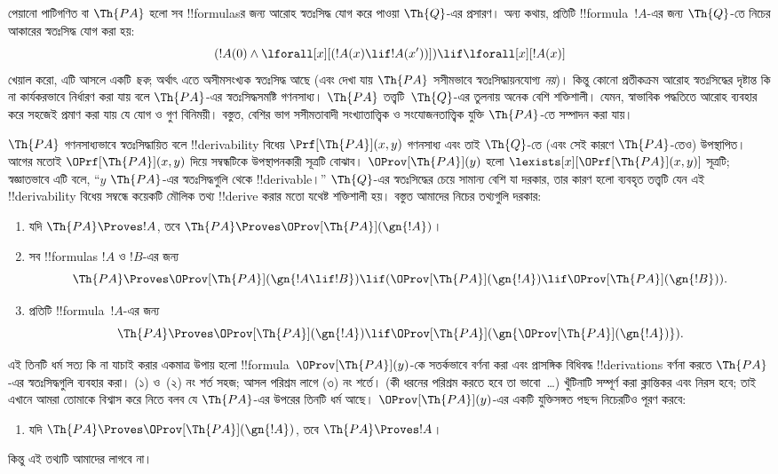 \documentclass[../../../include/open-logic-section]{subfiles}
\begin{document}


পেয়ানো পাটিগণিত বা $\Th{PA}$ হলো সব !!{formula}sর জন্য আরোহ
স্বতঃসিদ্ধ যোগ করে পাওয়া $\Th{Q}$-এর প্রসারণ। অন্য কথায়, প্রতিটি
!!{formula}~$!A$-এর জন্য $\Th{Q}$-তে নিচের আকারের স্বতঃসিদ্ধ যোগ করা হয়:
\[
(!A(0) \land \lforall[x][(!A(x) \lif !A(x'))]) \lif \lforall[x][!A(x)]
\]
খেয়াল করো, এটি আসলে একটি \emph{ছক}; অর্থাৎ এতে অসীমসংখ্যক স্বতঃসিদ্ধ
আছে (এবং দেখা যায় $\Th{PA}$ সসীমভাবে স্বতঃসিদ্ধায়নযোগ্য {\em নয়})।
কিন্তু কোনো প্রতীকক্রম আরোহ স্বতঃসিদ্ধের দৃষ্টান্ত কি না কার্যকরভাবে
নির্ধারণ করা যায় বলে $\Th{PA}$-এর স্বতঃসিদ্ধসমষ্টি গণনসাধ্য। $\Th{PA}$
তত্ত্বটি~$\Th{Q}$-এর তুলনায় অনেক বেশি শক্তিশালী। যেমন, স্বাভাবিক পদ্ধতিতে
আরোহ ব্যবহার করে সহজেই প্রমাণ করা যায় যে যোগ ও গুণ বিনিময়ী। বস্তুত,
বেশির ভাগ সসীমতাবাদী সংখ্যাতাত্ত্বিক ও সংযোজনতাত্ত্বিক যুক্তি
$\Th{PA}$-তে সম্পাদন করা যায়।

$\Th{PA}$ গণনসাধ্যভাবে স্বতঃসিদ্ধায়িত বলে !!{derivability} বিধেয়
$\Prf[\Th{PA}](x,y)$ গণনসাধ্য এবং তাই $\Th{Q}$-তে (এবং সেই কারণে
$\Th{PA}$-তেও) উপস্থাপিত। আগের মতোই $\OPrf[\Th{PA}](x,y)$ দিয়ে
সম্বন্ধটিকে উপস্থাপনকারী সূত্রটি বোঝাব। $\OProv[\Th{PA}](y)$ হলো
$\lexists[x][\OPrf[\Th{PA}](x,y)]$ সূত্রটি; স্বজ্ঞাতভাবে এটি বলে,
``$y$ $\Th{PA}$-এর স্বতঃসিদ্ধগুলি থেকে !!{derivable}।'' $\Th{Q}$-এর
স্বতঃসিদ্ধের চেয়ে সামান্য বেশি যা দরকার, তার কারণ হলো ব্যবহৃত তত্ত্বটি
যেন এই !!{derivability} বিধেয় সম্বন্ধে কয়েকটি মৌলিক তথ্য !!{derive}
করার মতো যথেষ্ট শক্তিশালী হয়। বস্তুত আমাদের নিচের তথ্যগুলি দরকার:
\begin{enumerate}
\item[P1.] যদি $\Th{PA} \Proves !A$, তবে $\Th{PA} \Proves
  \OProv[\Th{PA}](\gn{!A})$।
\item[P2.] সব !!{formula}s $!A$ ও $!B$-এর জন্য
  \[
  \Th{PA} \Proves \OProv[\Th{PA}](\gn{!A \lif !B}) \lif
  (\OProv[\Th{PA}](\gn{!A}) \lif \OProv[\Th{PA}](\gn{!B})).
  \]
\item[P3.] প্রতিটি !!{formula}~$!A$-এর জন্য
  \[
  \Th{PA} \Proves \OProv[\Th{PA}](\gn{!A})
  \lif \OProv[\Th{PA}](\gn{\OProv[\Th{PA}](\gn{!A})}).
  \]
\end{enumerate}
এই তিনটি ধর্ম সত্য কি না যাচাই করার একমাত্র উপায় হলো
!!{formula}~$\OProv[\Th{PA}](y)$-কে সতর্কভাবে বর্ণনা করা এবং প্রাসঙ্গিক
বিধিবদ্ধ !!{derivation}s বর্ণনা করতে $\Th{PA}$-এর স্বতঃসিদ্ধগুলি ব্যবহার
করা। (১) ও~(২) নং শর্ত সহজ; আসল পরিশ্রম লাগে (৩) নং শর্তে। (কী ধরনের
পরিশ্রম করতে হবে তা ভাবো~\dots) খুঁটিনাটি সম্পূর্ণ করা ক্লান্তিকর এবং
নিরস হবে; তাই এখানে আমরা তোমাকে বিশ্বাস করে নিতে বলব যে $\Th{PA}$-এর
উপরের তিনটি ধর্ম আছে। $\OProv[\Th{PA}](y)$-এর একটি যুক্তিসঙ্গত পছন্দ
নিচেরটিও পূরণ করবে:
\begin{enumerate}
\item[P4.] যদি $\Th{PA} \Proves \OProv[\Th{PA}](\gn{!A})$, তবে
  $\Th{PA} \Proves !A$।
\end{enumerate}
কিন্তু এই তথ্যটি আমাদের লাগবে না।
\end{document}

